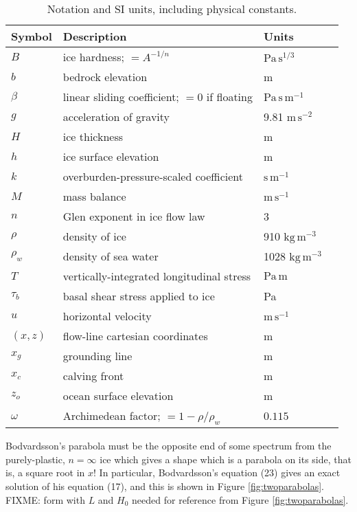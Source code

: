\documentclass[twocolumn,letterpaper]{igs}
\begin{document}
\small
\begin{table}
\caption{Notation and SI units, including physical constants.}\label{tab:notation}

\medskip
\begin{tabular}{llll}
Symbol & Description & Units \\ \hline
$B$ & ice hardness; $=A^{-1/n}$ & $\text{Pa}\,\text{s}^{1/3}$  \\
$b$ & bedrock elevation & m \\
$\beta$ & linear sliding coefficient; $=0$ if floating & $\text{Pa}\,\text{s}\,\text{m}^{-1}$ \\
$g$ & acceleration of gravity  & 9.81 $\text{m}\,\text{s}^{-2}$\\
$H$ & ice thickness & m \\
$h$ & ice surface elevation & m \\
$k$ & overburden-pressure-scaled coefficient  & $\text{s}\,\text{m}^{-1}$ \\
$M$ & mass balance & $\text{m}\,\text{s}^{-1}$ \\
$n$ & Glen exponent in ice flow law & 3 \\
$\rho$ & density of ice & 910 $\text{kg}\,\text{m}^{-3}$ \\
$\rho_w$ & density of sea water & 1028 $\text{kg}\,\text{m}^{-3}$ \\
$T$ & vertically-integrated longitudinal stress & $\text{Pa}\,\text{m}$ \\
$\tau_{b}$ & basal shear stress applied to ice & Pa \\
$u$ & horizontal velocity & $\text{m}\,\text{s}^{-1}$ \\
$(x,z)$ & flow-line cartesian coordinates & m  \\
$x_g$ & grounding line & m  \\
$x_c$ & calving front & m  \\
$z_o$ & ocean surface elevation & m \\
$\omega$ & Archimedean factor; $=1 - \rho/\rho_w$ & $0.115$
\end{tabular}
\end{table}

Bodvardsson's parabola must be the opposite end of some spectrum from the
purely-plastic, $n=\infty$ ice which gives a shape which is a parabola
on its side, that is, a square root in $x$!  In particular, Bodvardsson's equation (23) gives an exact solution of his equation (17), and this is shown in Figure \ref{fig:twoparabolas}.  FIXME: form with $L$ and $H_0$ needed for reference from Figure \ref{fig:twoparabolas}.
\end{document}

